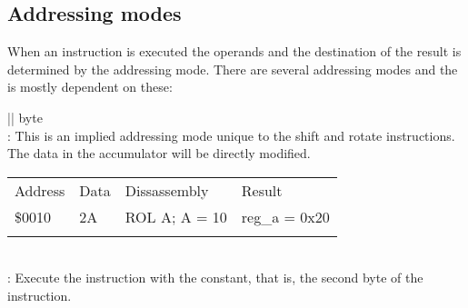\documentclass[letterpaper,10pt,english]{sphinxmanual}
\begin{document}
\subsection{Addressing modes}
\label{\detokenize{core_6502:addressing-modes}}\label{\detokenize{core_6502:addr-mode}}
\sphinxAtStartPar
When an instruction is executed the operands and the destination of the result
is determined by the addressing mode. There are several addressing modes and the
{\hyperref[\detokenize{core_6502:sm}]{}} is mostly dependent on these:


\begin{savenotes}\sphinxattablestart
\sphinxthistablewithglobalstyle
\centering
\begin{tabular}[t]{|*{1}{|}}
\sphinxtoprule
\sphinxstyletheadfamily 
{}\sphinxhyphen{}byte
\\
\sphinxmidrule
\sphinxtableatstartofbodyhook
\sphinxAtStartPar
{} : This is an implied addressing
mode unique to the shift and rotate instructions. The data in the
accumulator will be directly modified.

\sphinxAtStartPar
{}


\begin{savenotes}\sphinxattablestart
\sphinxthistablewithglobalstyle
\centering
\begin{tabulary}{\linewidth}[t]{|T|T|T|T|}
\sphinxtoprule
\sphinxstyletheadfamily 
\sphinxAtStartPar
Address
&\sphinxstyletheadfamily 
\sphinxAtStartPar
Data
&\sphinxstyletheadfamily 
\sphinxAtStartPar
Dissassembly
&\sphinxstyletheadfamily 
\sphinxAtStartPar
Result
\\
\sphinxmidrule
\sphinxtableatstartofbodyhook
\sphinxAtStartPar
\$0010
&
\sphinxAtStartPar
2A
&
\sphinxAtStartPar
ROL A; A = 10
&
\sphinxAtStartPar
reg\_a = 0x20
\\
\sphinxbottomrule
\end{tabulary}
\sphinxtableafterendhook\par
\sphinxattableend\end{savenotes}
\\
\sphinxhline
\sphinxAtStartPar
{}: Execute the instruction with the
constant, that is, the second byte of the instruction.

\sphinxAtStartPar
{}



\end{tabular}
\end{savenotes}
\end{document}
